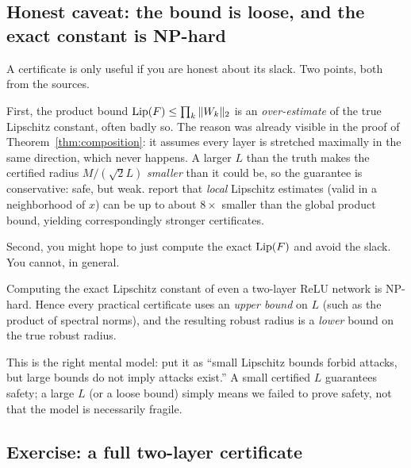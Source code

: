 \subsection{Honest caveat: the bound is loose, and the exact constant is NP-hard}
\label{sub:honest}

A certificate is only useful if you are honest about its slack. Two points, both from the sources.

First, the product bound $\operatorname{Lip}(F)\le\prod_k\|W_k\|_2$ is an \emph{over-estimate} of the true Lipschitz constant, often badly so. The reason was already visible in the proof of Theorem~\ref{thm:composition}: it assumes every layer is stretched maximally in the same direction, which never happens. A larger $L$ than the truth makes the certified radius $M/(\sqrt2 L)$ \emph{smaller} than it could be, so the guarantee is conservative: safe, but weak. \citet{hein2017formal} report that \emph{local} Lipschitz estimates (valid in a neighborhood of $x$) can be up to about $8\times$ smaller than the global product bound, yielding correspondingly stronger certificates.

Second, you might hope to just compute the exact $\operatorname{Lip}(F)$ and avoid the slack. You cannot, in general.

\begin{theorem}
\label{thm:nphard}
Computing the exact Lipschitz constant of even a two-layer ReLU network is NP-hard. Hence every practical certificate uses an \emph{upper bound} on $L$ (such as the product of spectral norms), and the resulting robust radius is a \emph{lower} bound on the true robust radius.
\end{theorem}

This is the right mental model: \citet{szegedy2014intriguing} put it as ``small Lipschitz bounds forbid attacks, but large bounds do not imply attacks exist.'' A small certified $L$ guarantees safety; a large $L$ (or a loose bound) simply means we failed to prove safety, not that the model is necessarily fragile.

\subsection{Exercise: a full two-layer certificate}
\label{sub:cert-exercise}

